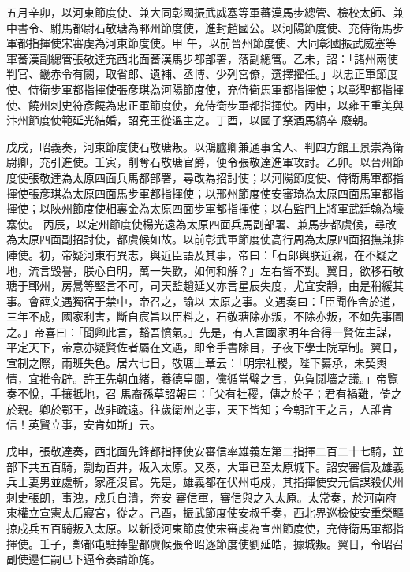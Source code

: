 \begin{pinyinscope}
 五月辛卯，以河東節度使、兼大同彰國振武威塞等軍蕃漢馬步總管、檢校太師、兼中書令、駙馬都尉石敬瑭為鄆州節度使，進封趙國公。以河陽節度使、充侍衛馬步軍都指揮使宋審虔為河東節度使。甲
 午，以前晉州節度使、大同彰國振武威塞等軍蕃漢副總管張敬達充西北面蕃漢馬步都部署，落副總管。乙未，詔：「諸州兩使判官、畿赤令有闕，取省郎、遺補、丞博、少列宮僚，選擇擢任。」以忠正軍節度使、侍衛步軍都指揮使張彥琪為河陽節度使，充侍衛馬軍都指揮使；以彰聖都指揮使、饒州刺史符彥饒為忠正軍節度使，充侍衛步軍都指揮使。丙申，以雍王重美與汴州節度使範延光結婚，詔兗王從溫主之。丁酉，以國子祭酒馬縞卒
 廢朝。



 戊戌，昭義奏，河東節度使石敬瑭叛。以鴻臚卿兼通事舍人、判四方館王景崇為衛尉卿，充引進使。壬寅，削奪石敬瑭官爵，便令張敬達進軍攻討。乙卯。以晉州節度使張敬達為太原四面兵馬都部署，尋改為招討使；以河陽節度使、侍衛馬軍都指揮使張彥琪為太原四面馬步軍都指揮使；以邢州節度使安審琦為太原四面馬軍都指揮使；以陜州節度使相裏金為太原四面步軍都指揮使；以右監門上將軍武廷翰為壕寨使。
 丙辰，以定州節度使楊光遠為太原四面兵馬副部署、兼馬步都虞候，尋改為太原四面副招討使，都虞候如故。以前彰武軍節度使高行周為太原四面招撫兼排陣使。初，帝疑河東有異志，與近臣語及其事，帝曰：「石郎與朕近親，在不疑之地，流言毀譽，朕心自明，萬一失歡，如何和解？」左右皆不對。翼日，欲移石敬瑭于鄆州，房暠等堅言不可，司天監趙延乂亦言星辰失度，尤宜安靜，由是稍緩其事。會薛文遇獨宿于禁中，帝召之，諭以
 太原之事。文遇奏曰：「臣聞作舍於道，三年不成，國家利害，斷自宸旨以臣料之，石敬瑭除亦叛，不除亦叛，不如先事圖之。」帝喜曰：「聞卿此言，豁吾憤氣。」先是，有人言國家明年合得一賢佐主謀，平定天下，帝意亦疑賢佐者屬在文遇，即令手書除目，子夜下學士院草制。翼日，宣制之際，兩班失色。居六七日，敬瑭上章云：「明宗社稷，陛下纂承，未契輿情，宜推令辟。許王先朝血緒，養德皇闈，儻循當璧之言，免負鬩墻之議。」帝覽奏不悅，手攘抵地，召
 馬裔孫草詔報曰：「父有社稷，傳之於子；君有禍難，倚之於親。卿於鄂王，故非疏遠。往歲衛州之事，天下皆知；今朝許王之言，人誰肯信！英賢立事，安肯如斯」云。



 戊申，張敬達奏，西北面先鋒都指揮使安審信率雄義左第二指揮二百二十七騎，並部下共五百騎，剽劫百井，叛入太原。又奏，大軍已至太原城下。詔安審信及雄義兵士妻男並處斬，家產沒官。先是，雄義都在伏州屯戍，其指揮使安元信謀殺伏州刺史張朗，事洩，戍兵自潰，奔安
 審信軍，審信與之入太原。太常奏，於河南府東權立宣憲太后寢宮，從之。己酉，振武節度使安叔千奏，西北界巡檢使安重榮驅掠戍兵五百騎叛入太原。以新授河東節度使宋審虔為宣州節度使，充侍衛馬軍都指揮使。壬子，鄴都屯駐捧聖都虞候張令昭逐節度使劉延皓，據城叛。翼日，令昭召副使邊仁嗣已下逼令奏請節旄。




\end{pinyinscope}

